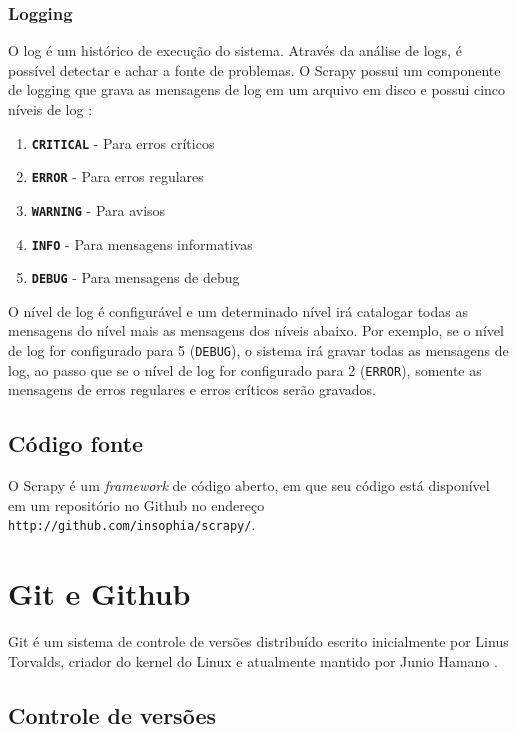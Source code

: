 \subsubsection{Logging}

O log é um histórico de execução do sistema. Através da análise de logs, é possível detectar e achar a fonte de problemas. O Scrapy possui um componente de logging que grava as mensagens de log em um arquivo em disco e possui cinco níveis de log \cite{scrapy_log}:

\begin{enumerate}
	\item \texttt{\textbf{CRITICAL}} - Para erros críticos
	\item \texttt{\textbf{ERROR}} - Para erros regulares
	\item \texttt{\textbf{WARNING}} - Para avisos
	\item \texttt{\textbf{INFO}} - Para mensagens informativas
	\item \texttt{\textbf{DEBUG}} - Para mensagens de debug
\end{enumerate}

O nível de log é configurável e um determinado nível irá catalogar todas as mensagens do nível mais as mensagens dos níveis abaixo. Por exemplo, se o nível de log for configurado para 5 (\texttt{DEBUG}), o sistema irá gravar todas as mensagens de log, ao passo que se o nível de log for configurado para 2 (\texttt{ERROR}), somente as mensagens de erros regulares e erros críticos serão gravados.

\subsection{Código fonte}

O Scrapy é um \emph{framework} de código aberto, em que seu código está disponível em um repositório no Github \cite{github} no endereço \texttt{http://github.com/insophia/scrapy/}.

\pagebreak
\section{Git e Github}

Git é um sistema de controle de versões distribuído escrito inicialmente por Linus Torvalds, criador do kernel do Linux e atualmente mantido por Junio Hamano \cite{progit}.

\subsection{Controle de versões}

